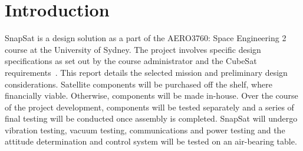\section{Introduction}
SnapSat is a design solution as a part of the AERO3760: Space Engineering 2 course at the University of Sydney. The project involves specific design specifications as set out by the course administrator and the CubeSat requirements~\cite{specification}. This report details the selected mission and preliminary design considerations. Satellite components will be purchased off the shelf, where financially viable. Otherwise, components will be made in-house. Over the course of the project development, components will be tested separately and a series of final testing will be conducted once assembly is completed. SnapSat will undergo vibration testing, vacuum testing, communications and power testing and the attitude determination and control system will be tested on an air-bearing table. 